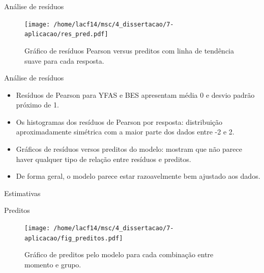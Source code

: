 \documentclass[
  ignorenonframetext,
  serif,
  professionalfont,
  usenames,
  dvipsnames,
  aspectratio = 169]{beamer}
\begin{document}
\begin{frame}{Análise de resíduos}
\protect\hypertarget{anuxe1lise-de-resuxedduos-1}{}
\begin{figure}[H]
\centering
\texttt{[image: /home/lacf14/msc/4\_dissertacao/7-aplicacao/res\_pred.pdf]}
\caption{Gráfico de resíduos Pearson versus preditos com linha de tendência suave para cada resposta.}
\label{fig:diagnostico2}
\end{figure}
\end{frame}

\begin{frame}{Análise de resíduos}
\protect\hypertarget{anuxe1lise-de-resuxedduos-2}{}
\begin{itemize}
  \itemsep 2ex
  
  \item Resíduos de Pearson para YFAS e BES apresentam média 0 e desvio padrão próximo de 1. 

  \item Os histogramas dos resíduos de Pearson por resposta: distribuição aproximadamente simétrica com a maior parte dos dados entre -2 e 2.

  \item Gráficos de resíduos versos preditos do modelo: mostram que não parece haver qualquer tipo de relação entre resíduos e preditos. 

  \item De forma geral, o modelo parece estar razoavelmente bem ajustado aos dados.
  
\end{itemize}
\end{frame}

\begin{frame}{Estimativas}
\protect\hypertarget{estimativas}{}
\end{frame}

\begin{frame}{Preditos}
\protect\hypertarget{preditos}{}
\begin{figure}[H]
\centering
\texttt{[image: /home/lacf14/msc/4\_dissertacao/7-aplicacao/fig\_preditos.pdf]}
\caption{Gráfico de preditos pelo modelo para cada combinação entre momento e grupo.}
\label{fig:preds}
\end{figure}
\end{frame}
\end{document}
